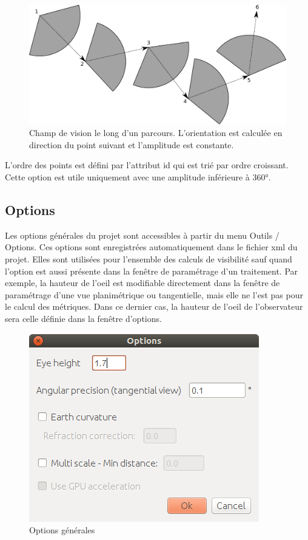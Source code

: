 \documentclass{report}
\begin{document}
\begin{figure}[H]
	\includegraphics[scale=0.8]{img/path_orien.pdf} 
	\caption{Champ de vision le long d'un parcours. L'orientation est calculée en direction du point suivant et l'amplitude est constante.}
	\label{path_orien}
\end{figure}

L'ordre des points est défini par l'attribut id qui est trié par ordre croissant.
Cette option est utile uniquement avec une amplitude inférieure à 360°.


\subsection{Options}
\label{options}
Les options générales du projet sont accessibles à partir du menu Outils / Options.
Ces options sont enregistrées automatiquement dans le fichier xml du projet. Elles sont utilisées pour l'ensemble des calculs de visibilité sauf quand l'option est aussi présente dans la fenêtre de paramétrage d'un traitement. Par exemple, la hauteur de l'oeil est modifiable directement dans la fenêtre de paramétrage d'une vue planimétrique ou tangentielle, mais elle ne l'est pas pour le calcul des métriques. Dans ce dernier cas, la hauteur de l'oeil de l'observateur sera celle définie dans la fenêtre d'options.

\begin{figure}[H]
	\includegraphics[scale=0.5]{img/options-en.png} 
	\caption{Options générales}
\end{figure}
\end{document}
